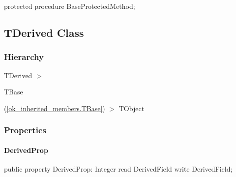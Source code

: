 \documentclass{report}
\begin{document}
\begin{list}{}{
\setlength{\itemindent}{0cm}
\setlength{\listparindent}{0cm}
\setlength{\leftmargin}{\evensidemargin}
\addtolength{\leftmargin}{\tmplength}
\settowidth{\labelsep}{X}
\addtolength{\leftmargin}{\labelsep}
\setlength{\labelwidth}{\tmplength}
}
\begin{flushleft}
\item[\textbf{Declaration}\hfill]
\begin{ttfamily}
protected procedure BaseProtectedMethod;\end{ttfamily}


\end{flushleft}
\end{list}
\subsection*{TDerived Class}
\subsubsection*{\large{\textbf{Hierarchy}}\normalsize\hspace{1ex}\hfill}
TDerived {$>$} \begin{ttfamily}TBase\end{ttfamily}(\ref{ok_inherited_members.TBase}) {$>$} 
TObject
\subsubsection*{\large{\textbf{Properties}}\normalsize\hspace{1ex}\hfill}
\paragraph*{DerivedProp}\hspace*{\fill}

\begin{list}{}{
\setlength{\itemindent}{0cm}
\setlength{\listparindent}{0cm}
\setlength{\leftmargin}{\evensidemargin}
\addtolength{\leftmargin}{\tmplength}
\settowidth{\labelsep}{X}
\addtolength{\leftmargin}{\labelsep}
\setlength{\labelwidth}{\tmplength}
}
\begin{flushleft}
\item[\textbf{Declaration}\hfill]
\begin{ttfamily}
public property DerivedProp: Integer read DerivedField write DerivedField;\end{ttfamily}


\end{flushleft}
\end{list}
\end{document}
